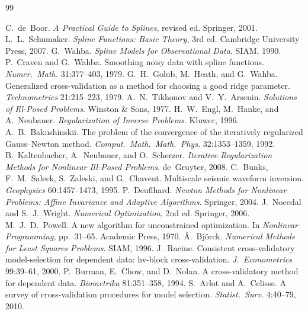\begin{thebibliography}{99}

 C.~de~Boor. \textit{A Practical Guide to Splines},
  revised ed. Springer, 2001.
 L.~L.~Schumaker. \textit{Spline Functions: Basic
  Theory}, 3rd ed. Cambridge University Press, 2007.
 G.~Wahba. \textit{Spline Models for Observational
  Data}. SIAM, 1990.
 P.~Craven and G.~Wahba. Smoothing noisy data with
  spline functions. \textit{Numer.\ Math.} 31:377--403, 1979.
 G.~H.~Golub, M.~Heath, and G.~Wahba. Generalized
  cross-validation as a method for choosing a good ridge parameter.
  \textit{Technometrics} 21:215--223, 1979.
 A.~N.~Tikhonov and V.~Y.~Arsenin. \textit{Solutions
  of Ill-Posed Problems}. Winston \& Sons, 1977.
 H.~W.~Engl, M.~Hanke, and A.~Neubauer.
  \textit{Regularization of Inverse Problems}. Kluwer, 1996.
 A.~B.~Bakushinskii. The problem of the
  convergence of the iteratively regularized Gauss--Newton method.
  \textit{Comput.\ Math.\ Math.\ Phys.} 32:1353--1359, 1992.
 B.~Kaltenbacher, A.~Neubauer, and O.~Scherzer.
  \textit{Iterative Regularization Methods for Nonlinear Ill-Posed
  Problems}. de~Gruyter, 2008.
 C.~Bunks, F.~M.~Saleck, S.~Zaleski, and G.~Chavent.
  Multiscale seismic waveform inversion. \textit{Geophysics}
  60:1457--1473, 1995.
 P.~Deuflhard. \textit{Newton Methods for Nonlinear
  Problems: Affine Invariance and Adaptive Algorithms}. Springer, 2004.
 J.~Nocedal and S.~J.~Wright. \textit{Numerical
  Optimization}, 2nd ed. Springer, 2006.
 M.~J.~D.~Powell. A new algorithm for unconstrained
  optimization. In \textit{Nonlinear Programming}, pp.~31--65. Academic
  Press, 1970.
 {\AA}.~Bj{\"o}rck. \textit{Numerical Methods for Least
  Squares Problems}. SIAM, 1996.
 J.~Racine. Consistent cross-validatory
  model-selection for dependent data: hv-block cross-validation.
  \textit{J.\ Econometrics} 99:39--61, 2000.
 P.~Burman, E.~Chow, and D.~Nolan. A cross-validatory
  method for dependent data. \textit{Biometrika} 81:351--358, 1994.
 S.~Arlot and A.~Celisse. A survey of cross-validation
  procedures for model selection. \textit{Statist.\ Surv.} 4:40--79, 2010.

\end{thebibliography}
